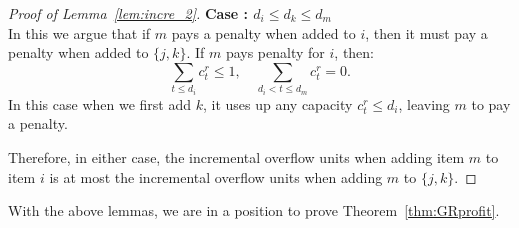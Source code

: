 \begin{proof}[Proof of Lemma~\ref{lem:incre_2}]
{\bf Case : $d_i \leq d_k \leq d_m$ }\\ 
In this we argue that if $m$ pays a penalty when added to $i$, then it must pay a penalty when added to $\{j,k \}$. If $m$ pays penalty for $i$, then:
\[  \sum_{t \leq d_i} c_t^r \leq 1 , \quad \sum_{ d_i < t \leq d_m } c_t^r = 0. \]
In this case when we first add $k$, it uses up any capacity $c_t^r \leq d_i$, leaving $m$ to pay a penalty.

Therefore, in either case, the incremental overflow units when adding item $m$ to item $i$ is at most the incremental overflow units when adding $m$ to $\{j,k\}$. 
\end{proof}







With the above lemmas, we are in a position to prove Theorem~\ref{thm:GRprofit}. 
